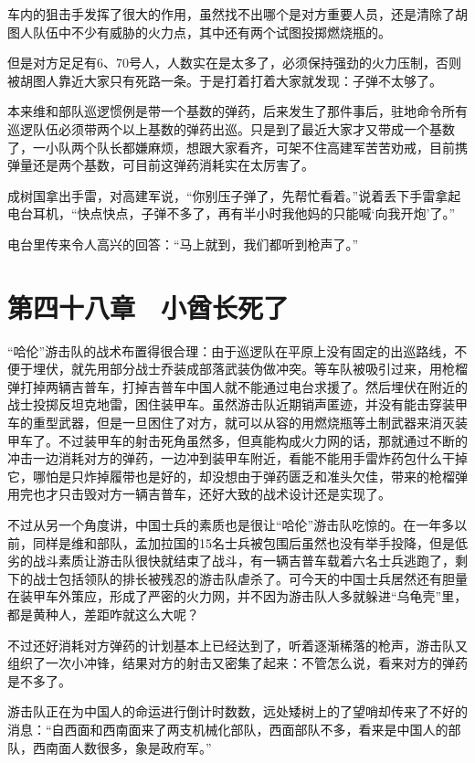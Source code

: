 车内的狙击手发挥了很大的作用，虽然找不出哪个是对方重要人员，还是清除了胡图人队伍中不少有威胁的火力点，其中还有两个试图投掷燃烧瓶的。

但是对方足足有6、70号人，人数实在是太多了，必须保持强劲的火力压制，否则被胡图人靠近大家只有死路一条。于是打着打着大家就发现：子弹不太够了。

本来维和部队巡逻惯例是带一个基数的弹药，后来发生了那件事后，驻地命令所有巡逻队伍必须带两个以上基数的弹药出巡。只是到了最近大家才又带成一个基数了，一小队两个队长都嫌麻烦，想跟大家看齐，可架不住高建军苦苦劝戒，目前携弹量还是两个基数，可目前这弹药消耗实在太厉害了。

成树国拿出手雷，对高建军说，“你别压子弹了，先帮忙看着。”说着丢下手雷拿起电台耳机，“快点快点，子弹不多了，再有半小时我他妈的只能喊‘向我开炮’了。”

电台里传来令人高兴的回答：“马上就到，我们都听到枪声了。”

\section{第四十八章　小酋长死了}

“哈伦”游击队的战术布置得很合理：由于巡逻队在平原上没有固定的出巡路线，不便于埋伏，就先用部分战士乔装成部落武装伪做冲突。等车队被吸引过来，用枪榴弹打掉两辆吉普车，打掉吉普车中国人就不能通过电台求援了。然后埋伏在附近的战士投掷反坦克地雷，困住装甲车。虽然游击队近期销声匿迹，并没有能击穿装甲车的重型武器，但是一旦困住了对方，就可以从容的用燃烧瓶等土制武器来消灭装甲车了。不过装甲车的射击死角虽然多，但真能构成火力网的话，那就通过不断的冲击一边消耗对方的弹药，一边冲到装甲车附近，看能不能用手雷炸药包什么干掉它，哪怕是只炸掉履带也是好的，却没想由于弹药匮乏和准头欠佳，带来的枪榴弹用完也才只击毁对方一辆吉普车，还好大致的战术设计还是实现了。

不过从另一个角度讲，中国士兵的素质也是很让“哈伦”游击队吃惊的。在一年多以前，同样是维和部队，孟加拉国的15名士兵被包围后虽然也没有举手投降，但是低劣的战斗素质让游击队很快就结束了战斗，有一辆吉普车载着六名士兵逃跑了，剩下的战士包括领队的排长被残忍的游击队虐杀了。可今天的中国士兵居然还有胆量在装甲车外策应，形成了严密的火力网，并不因为游击队人多就躲进“乌龟壳”里，都是黄种人，差距咋就这么大呢？

不过还好消耗对方弹药的计划基本上已经达到了，听着逐渐稀落的枪声，游击队又组织了一次小冲锋，结果对方的射击又密集了起来：不管怎么说，看来对方的弹药是不多了。

游击队正在为中国人的命运进行倒计时数数，远处矮树上的了望哨却传来了不好的消息：“自西面和西南面来了两支机械化部队，西面部队不多，看来是中国人的部队，西南面人数很多，象是政府军。”

